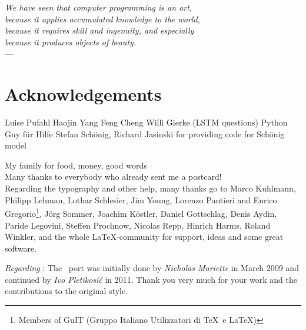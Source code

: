 

\begin{flushright}{\slshape    
We have seen that computer programming is an art, \\ 
because it applies accumulated knowledge to the world, \\ 
because it requires skill and ingenuity, and especially \\
because it produces objects of beauty.} \\ \medskip
---  \citep{knuth:1974}
\end{flushright}

\bigskip


\begingroup

\let\clearpage\relax
\let\cleardoublepage\relax
\let\cleardoublepage\relax

\chapter*{Acknowledgements}

Luise Pufahl
Haojin Yang
Feng Cheng
Willi Gierke (LSTM questions)
Python Guy für Hilfe
Stefan Schönig, Richard Jasinski for providing code for Schönig \cite{schoenig2018} model


My family for food, money, good words\\

\noindent Many thanks to everybody who already sent me a postcard!\\

\noindent Regarding the typography and other help, many thanks go to Marco Kuhlmann, Philipp Lehman, Lothar Schlesier, Jim Young, Lorenzo Pantieri and Enrico Gregorio\footnote{Members of GuIT (Gruppo Italiano Utilizzatori di \TeX\ e \LaTeX )}, J\"org Sommer, Joachim K\"ostler, Daniel Gottschlag, Denis Aydin, Paride Legovini, Steffen Prochnow, Nicolas Repp, Hinrich Harms, Roland Winkler, and the whole \LaTeX-community for support, ideas and some great software.

\bigskip

\noindent\emph{Regarding \mLyX}: The \mLyX\ port was initially done by
\emph{Nicholas Mariette} in March 2009 and continued by
\emph{Ivo Pletikosi\'c} in 2011. Thank you very much for your work and the contributions to the original style.

\endgroup